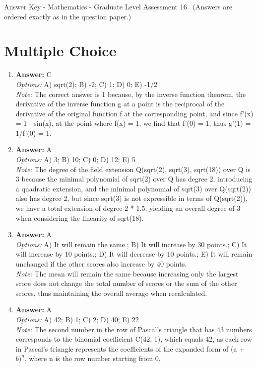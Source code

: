 \documentclass[12pt]{article}
\begin{document}
\begin{center}
Answer Key - Mathematics - Graduate Level Assessment 16 \
\small (Answers are ordered exactly as in the question paper.)
\end{center}

\section*{Multiple Choice}
\begin{enumerate}[label=\arabic*.]
\item \textbf{Answer:} C
\\ \textit{Options:} A) sqrt(2); B) -2; C) 1; D) 0; E) -1/2
\\ \textit{Note:} The correct answer is 1 because, by the inverse function theorem, the derivative of the inverse function g at a point is the reciprocal of the derivative of the original function f at the corresponding point, and since f'(x) = 1 - sin(x), at the point where f(x) = 1, we find that f'(0) = 1, thus g'(1) = 1/f'(0) = 1.
\item \textbf{Answer:} A
\\ \textit{Options:} A) 3; B) 10; C) 0; D) 12; E) 5
\\ \textit{Note:} The degree of the field extension Q(sqrt(2), sqrt(3), sqrt(18)) over Q is 3 because the minimal polynomial of sqrt(2) over Q has degree 2, introducing a quadratic extension, and the minimal polynomial of sqrt(3) over Q(sqrt(2)) also has degree 2, but since sqrt(3) is not expressible in terms of Q(sqrt(2)), we have a total extension of degree 2 * 1.5, yielding an overall degree of 3 when considering the linearity of sqrt(18).
\item \textbf{Answer:} A
\\ \textit{Options:} A) It will remain the same.; B) It will increase by 30 points.; C) It will increase by 10 points.; D) It will decrease by 10 points.; E) It will remain unchanged if the other scores also increase by 40 points.
\\ \textit{Note:} The mean will remain the same because increasing only the largest score does not change the total number of scores or the sum of the other scores, thus maintaining the overall average when recalculated.
\item \textbf{Answer:} A
\\ \textit{Options:} A) 42; B) 1; C) 2; D) 40; E) 22
\\ \textit{Note:} The second number in the row of Pascal's triangle that has 43 numbers corresponds to the binomial coefficient C(42, 1), which equals 42, as each row in Pascal's triangle represents the coefficients of the expanded form of (a + $b)^n$, where n is the row number starting from 0.

\end{enumerate}
\end{document}
